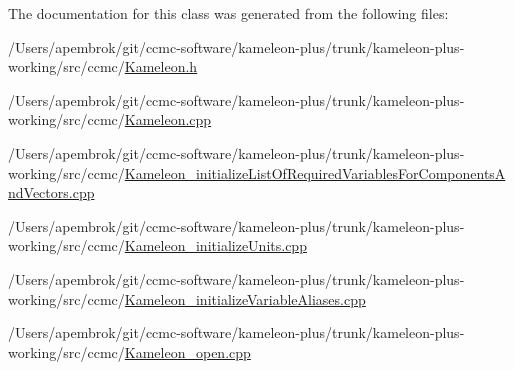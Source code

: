 The documentation for this class was generated from the following files\-:\begin{DoxyCompactItemize}
\item 
/\-Users/apembrok/git/ccmc-\/software/kameleon-\/plus/trunk/kameleon-\/plus-\/working/src/ccmc/\hyperlink{_kameleon_8h}{Kameleon.\-h}\item 
/\-Users/apembrok/git/ccmc-\/software/kameleon-\/plus/trunk/kameleon-\/plus-\/working/src/ccmc/\hyperlink{_kameleon_8cpp}{Kameleon.\-cpp}\item 
/\-Users/apembrok/git/ccmc-\/software/kameleon-\/plus/trunk/kameleon-\/plus-\/working/src/ccmc/\hyperlink{_kameleon__initialize_list_of_required_variables_for_components_and_vectors_8cpp}{Kameleon\-\_\-initialize\-List\-Of\-Required\-Variables\-For\-Components\-And\-Vectors.\-cpp}\item 
/\-Users/apembrok/git/ccmc-\/software/kameleon-\/plus/trunk/kameleon-\/plus-\/working/src/ccmc/\hyperlink{_kameleon__initialize_units_8cpp}{Kameleon\-\_\-initialize\-Units.\-cpp}\item 
/\-Users/apembrok/git/ccmc-\/software/kameleon-\/plus/trunk/kameleon-\/plus-\/working/src/ccmc/\hyperlink{_kameleon__initialize_variable_aliases_8cpp}{Kameleon\-\_\-initialize\-Variable\-Aliases.\-cpp}\item 
/\-Users/apembrok/git/ccmc-\/software/kameleon-\/plus/trunk/kameleon-\/plus-\/working/src/ccmc/\hyperlink{_kameleon__open_8cpp}{Kameleon\-\_\-open.\-cpp}\end{DoxyCompactItemize}
